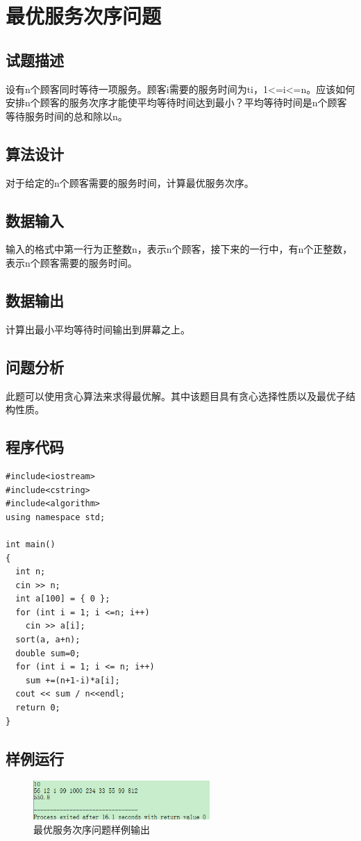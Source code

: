 \documentclass[UTF8]{ctexart}
\begin{document}
    \section{最优服务次序问题}
    \subsection{试题描述}
    设有n个顾客同时等待一项服务。顾客i需要的服务时间为ti，1<=i<=n。应该如何安排n个顾客的服务次序才能使平均等待时间达到最小？平均等待时间是n个顾客等待服务时间的总和除以n。
    \subsection{算法设计}
    对于给定的n个顾客需要的服务时间，计算最优服务次序。
    \subsection{数据输入}
    输入的格式中第一行为正整数n，表示n个顾客，接下来的一行中，有n个正整数，表示n个顾客需要的服务时间。
    \subsection{数据输出}
    计算出最小平均等待时间输出到屏幕之上。
    \subsection{问题分析}
    此题可以使用贪心算法来求得最优解。其中该题目具有贪心选择性质以及最优子结构性质。
    \subsection{程序代码}
    \begin{small}
    \begin{lstlisting}
#include<iostream>
#include<cstring>
#include<algorithm>
using namespace std;

int main()
{
  int n;
  cin >> n;
  int a[100] = { 0 };
  for (int i = 1; i <=n; i++)
    cin >> a[i];
  sort(a, a+n);
  double sum=0;
  for (int i = 1; i <= n; i++)
    sum +=(n+1-i)*a[i];
  cout << sum / n<<endl;
  return 0;
}
    \end{lstlisting}
    \end{small}
    \subsection{样例运行}
    \begin{figure}[!htb]
      \centering
      \includegraphics[width=0.6\textwidth]{../img/4.6.PNG}
      \caption{最优服务次序问题样例输出}\label{最优服务次序问题样例输出}
    \end{figure}
\end{document}
